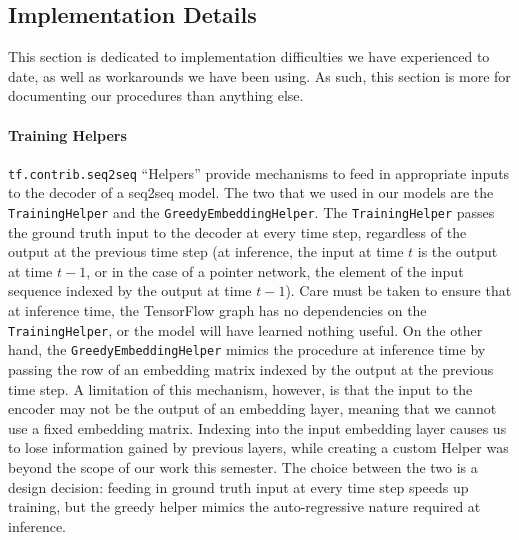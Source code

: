 \documentclass{article}
\begin{document}
\subsection{Implementation Details}
This section is dedicated to implementation difficulties we have experienced to date, as well as workarounds we have been using. As such, this section is more for documenting our procedures than anything else. 

\paragraph{Training Helpers}
\texttt{tf.contrib.seq2seq} ``Helpers'' provide mechanisms to feed in appropriate inputs to the decoder of a seq2seq model. The two that we used in our models are the \texttt{TrainingHelper} and the \texttt{GreedyEmbeddingHelper}. The \texttt{TrainingHelper} passes the ground truth input to the decoder at every time step, regardless of the output at the previous time step (at inference, the input at time $t$ is the output at time $t-1$, or in the case of a pointer network, the element of the input sequence indexed by the output at time $t-1$). Care must be taken to ensure that at inference time, the TensorFlow graph has no dependencies on the \texttt{TrainingHelper}, or the model will have learned nothing useful. On the other hand, the \texttt{GreedyEmbeddingHelper} mimics the procedure at inference time by passing the row of an embedding matrix indexed by the output at the previous time step. A limitation of this mechanism, however, is that the input to the encoder may not be the output of an embedding layer, meaning that we cannot use a fixed embedding matrix. Indexing into the input embedding layer causes us to lose information gained by previous layers, while creating a custom Helper was beyond the scope of our work this semester. The choice between the two is a design decision: feeding in ground truth input at every time step speeds up training, but the greedy helper mimics the auto-regressive nature required at inference. 
\end{document}
